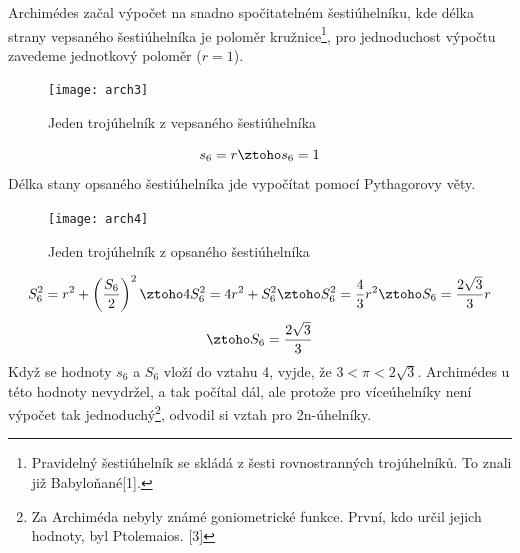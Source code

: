 \documentclass[rocnikovka]{gzwroc} %
\begin{document}
Archimédes začal výpočet na snadno spočitatelném šestiúhelníku, kde délka strany vepsaného šestiúhelníka je poloměr kružnice\footnote[5]{Pravidelný šestiúhelník se skládá z šesti rovnostranných trojúhelníků. To znali již Babyloňané[1].}, pro jednoduchost výpočtu zavedeme jednotkový poloměr ($r=1$).
\begin{figure}[!ht]
\texttt{[image: arch3]}
\caption{Jeden trojúhelník z vepsaného šestiúhelníka}
\label{fig:kruh}
\end{figure}
$$
s_6=r \ztoho s_6=1
$$
Délka stany opsaného šestiúhelníka jde vypočítat pomocí Pythagorovy věty.
\begin{figure}[!ht]
\texttt{[image: arch4]}
\caption{Jeden trojúhelník z opsaného šestiúhelníka}
\label{fig:kruh}
\end{figure}
$$ S_6^2=r^2+\left(\frac{S_6}{2}\right)^2 \ztoho 4S_6^2=4r^2+S_6^2 \ztoho S_6^2=\frac{4}{3}r^2 \ztoho S_6=\frac{2\sqrt{3}}{3}r $$
$$
\ztoho S_6=\frac{2\sqrt{3}}{3}
$$
Když se hodnoty $s_6$ a $S_6$ vloží do vztahu 4, vyjde, že $3<\pi <2\sqrt{3}$. Archimédes u této hodnoty nevydržel, a tak počítal dál, ale protože pro víceúhelníky není výpočet tak jednoduchý\footnote[6]{Za Archiméda nebyly známé goniometrické funkce. První, kdo určil jejich hodnoty, byl Ptolemaios. [3]}, odvodil si vztah pro 2n-úhelníky.
\end{document}
